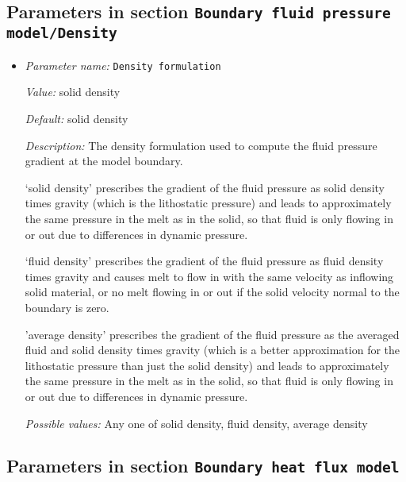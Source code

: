\subsection{Parameters in section \tt Boundary fluid pressure model/Density}
\label{parameters:Boundary_20fluid_20pressure_20model/Density}

\begin{itemize}
\item {\it Parameter name:} {\tt Density formulation}
\label{parameters:Boundary fluid pressure model/Density/Density formulation}


{\it Value:} solid density


{\it Default:} solid density


{\it Description:} The density formulation used to compute the fluid pressure gradient at the model boundary.

`solid density' prescribes the gradient of the fluid pressure as solid density times gravity (which is the lithostatic pressure) and leads to approximately the same pressure in the melt as in the solid, so that fluid is only flowing in or out due to differences in dynamic pressure.

`fluid density' prescribes the gradient of the fluid pressure as fluid density times gravity and causes melt to flow in with the same velocity as inflowing solid material, or no melt flowing in or out if the solid velocity normal to the boundary is zero.

'average density' prescribes the gradient of the fluid pressure as the averaged fluid and solid density times gravity (which is a better approximation for the lithostatic pressure than just the solid density) and leads to approximately the same pressure in the melt as in the solid, so that fluid is only flowing in or out due to differences in dynamic pressure.


{\it Possible values:} Any one of solid density, fluid density, average density
\end{itemize}

\subsection{Parameters in section \tt Boundary heat flux model}
\label{parameters:Boundary_20heat_20flux_20model}

